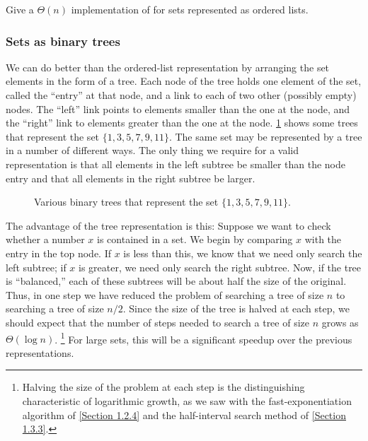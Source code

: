 \begin{exercise}
	\label{Exercise 2.62}
	Give a \( Θ(n) \) implementation of  for sets represented as ordered lists.
\end{exercise}



\subsubsection*{Sets as binary trees}

We can do better than the ordered-list representation by arranging the set elements in the form of a tree.
Each node of the tree holds one element of the set, called the “entry” at that node, and a link to each of two other (possibly empty) nodes.
The “left” link points to elements smaller than the one at the node, and the “right” link to elements greater than the one at the node.
\cref{Figure 2.16} shows some trees that represent the set \( \{ 1, 3, 5, 7, 9, 11 \} \).
The same set may be represented by a tree in a number of different ways.
The only thing we require for a valid representation is that all elements in the left subtree be smaller than the node entry and that all elements in the right subtree be larger.

\begin{figure}[tb]
	\centering
	
	\caption{
		Various binary trees that represent the set \( \{ 1, 3, 5, 7, 9, 11 \} \).
	}
	\label{Figure 2.16}
\end{figure}

The advantage of the tree representation is this:
Suppose we want to check whether a number \( x \) is contained in a set.
We begin by comparing \( x \) with the entry in the top node.
If \( x \) is less than this, we know that we need only search the left subtree;
if \( x \) is greater, we need only search the right subtree.
Now, if the tree is “balanced,” each of these subtrees will be about half the size of the original.
Thus, in one step we have reduced the problem of searching a tree of size \( n \) to searching a tree of size \( n / 2 \).
Since the size of the tree is halved at each step, we should expect that the number of steps needed to search a tree of size \( n \) grows as \( Θ(\log n) \).%
\footnote{
	Halving the size of the problem at each step is the distinguishing characteristic of logarithmic growth, as we saw with the fast-exponentiation algorithm of \cref{Section 1.2.4} and the half-interval search method of \cref{Section 1.3.3}.
}
For large sets, this will be a significant speedup over the previous representations.

